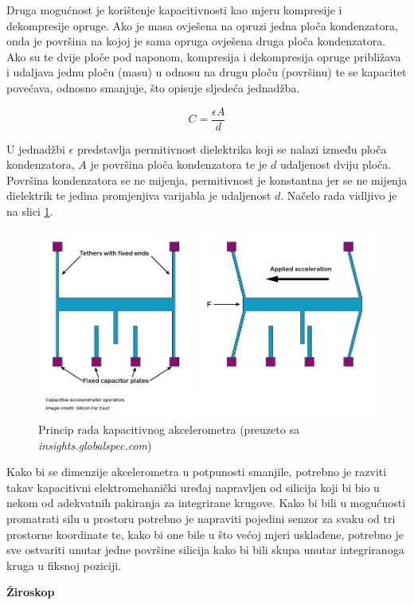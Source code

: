 \documentclass[times, utf8, diplomski]{fer}
\begin{document}
Druga mogućnost je korištenje kapacitivnosti kao mjeru kompresije i dekompresije opruge. Ako je masa ovješena na opruzi jedna ploča
kondenzatora, onda je površina na kojoj je sama opruga ovješena druga ploča kondenzatora. Ako su te dvije ploče pod naponom,
kompresija i dekompresija opruge približava i udaljava jednu ploču (masu) u odnosu na drugu ploču (površinu) te se kapacitet
povećava, odnosno smanjuje, što opisuje sljedeća jednadžba.

$$
C = \frac{\epsilon A}{d}
$$

U jednadžbi $\epsilon$ predstavlja permitivnost dielektrika koji se nalazi između ploča kondenzatora, $A$ je površina ploča
kondenzatora te je $d$ udaljenost dviju ploča. Površina kondenzatora se ne mijenja, permitivnost je konstantna jer se ne
mijenja dielektrik te jedina promjenjiva varijabla je udaljenost $d$. Načelo rada vidljivo je na slici \ref{accmtr}.


\begin{figure}[h!]
    \includegraphics[width=\textwidth]{Accelerometers.jpg}
    \caption{Princip rada kapacitivnog akcelerometra (preuzeto sa \textit{insights.globalspec.com})}
    \label{accmtr}
\end{figure}

Kako bi se dimenzije akcelerometra u potpunosti smanjile, potrebno je razviti takav kapacitivni elektromehanički uređaj napravljen od
silicija koji bi bio u nekom od adekvatnih pakiranja za integrirane krugove. Kako bi bili u mogućnosti promatrati silu u
prostoru potrebno je napraviti pojedini senzor za svaku od tri prostorne koordinate te, kako bi one bile u što većoj mjeri usklađene,
potrebno je sve ostvariti unutar jedne površine silicija kako bi bili skupa unutar integriranoga kruga u fiksnoj poziciji.

\textbf{Žiroskop}
\end{document}
